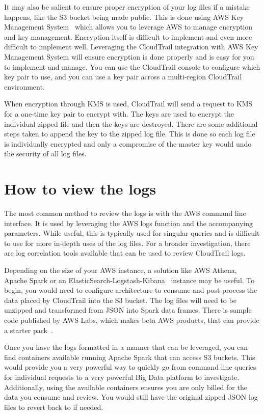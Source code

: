It may also be salient to ensure proper encryption of your log files if a mistake
happens, like the S3 bucket being made public. This is done using AWS Key
Management System~\cite{hid-sp18-518-CloudTrail-KMS} which allows you to 
leverage AWS to manage encryption and key management. Encryption itself is 
difficult to implement and even more difficult to implement well. Leveraging the 
CloudTrail integration with AWS Key Management System will ensure encryption is 
done properly and is easy for you to implement and manage. You can use the 
CloudTrail console to configure which key pair to use, and you can use a key pair
across a multi-region CloudTrail environment.

When encryption through KMS is used, CloudTrail will send a request to KMS for a
one-time key pair to encrypt with. The keys are used to encrypt the individual
zipped file and then the keys are destroyed. There are some additional steps taken
to append the key to the zipped log file. This is done so each log file is 
individually encrypted and only a compromise of the master key would undo the 
security of all log files.

\section{How to view the logs}

The most common method to review the logs is with the AWS command line interface. 
It is used by leveraging the AWS logs function and the accompanying parameters.
While useful, this is typically used for singular queries and is difficult to
use for more in-depth uses of the log files. For a broader investigation, there
are log correlation tools available that can be used to review CloudTrail logs.

Depending on the size of your AWS instance, a solution like AWS Athena, Apache 
Spark or an ElasticSearch-Logstash-Kibana~\cite{hid-sp18-518-CloudTrail-ELK} 
instance may be useful. To begin, you would need to configure architecture to 
consume and post-process the data placed by CloudTrail into the S3 bucket. The 
log files will need to be unzipped and transformed from JSON into Spark data 
frames. There is sample code published by AWS Labs, which makes beta AWS 
products, that can provide a starter pack~\cite{hid-sp18-518-CloudTrail-timely}.

Once you have the logs formatted in a manner that can be leveraged, you can
find containers available running Apache Spark that can access S3 buckets. This
would provide you a very powerful way to quickly go from command line queries
for individual requests to a very powerful Big Data platform to investigate. 
Additionally, using the available containers ensures you are only billed for
the data you consume and review. You would still have the original zipped JSON
log files to revert back to if needed.

